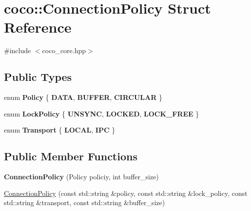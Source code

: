 \hypertarget{structcoco_1_1_connection_policy}{}\section{coco\+:\+:Connection\+Policy Struct Reference}
\label{structcoco_1_1_connection_policy}


{\ttfamily \#include $<$coco\+\_\+core.\+hpp$>$}

\subsection*{Public Types}
\begin{DoxyCompactItemize}
\item 
\hypertarget{structcoco_1_1_connection_policy_ae4444c2b22d2444489ec40a5fd27e127}{}enum {\bfseries Policy} \{ {\bfseries D\+A\+T\+A}, 
{\bfseries B\+U\+F\+F\+E\+R}, 
{\bfseries C\+I\+R\+C\+U\+L\+A\+R}
 \}\label{structcoco_1_1_connection_policy_ae4444c2b22d2444489ec40a5fd27e127}

\item 
\hypertarget{structcoco_1_1_connection_policy_ae399c2754fe841164eb811be00a279e6}{}enum {\bfseries Lock\+Policy} \{ {\bfseries U\+N\+S\+Y\+N\+C}, 
{\bfseries L\+O\+C\+K\+E\+D}, 
{\bfseries L\+O\+C\+K\+\_\+\+F\+R\+E\+E}
 \}\label{structcoco_1_1_connection_policy_ae399c2754fe841164eb811be00a279e6}

\item 
\hypertarget{structcoco_1_1_connection_policy_a0a3597498b74762ddc481ed30db81e69}{}enum {\bfseries Transport} \{ {\bfseries L\+O\+C\+A\+L}, 
{\bfseries I\+P\+C}
 \}\label{structcoco_1_1_connection_policy_a0a3597498b74762ddc481ed30db81e69}

\end{DoxyCompactItemize}
\subsection*{Public Member Functions}
\begin{DoxyCompactItemize}
\item 
\hypertarget{structcoco_1_1_connection_policy_a47fdbf4f24658456070fcbe0467b41ba}{}{\bfseries Connection\+Policy} (Policy policiy, int buffer\+\_\+size)\label{structcoco_1_1_connection_policy_a47fdbf4f24658456070fcbe0467b41ba}

\item 
\hyperlink{structcoco_1_1_connection_policy_a7961aac0b07c107a038ed6c58882307b}{Connection\+Policy} (const std\+::string \&policy, const std\+::string \&lock\+\_\+policy, const std\+::string \&transport, const std\+::string \&buffer\+\_\+size)
\end{DoxyCompactItemize}
